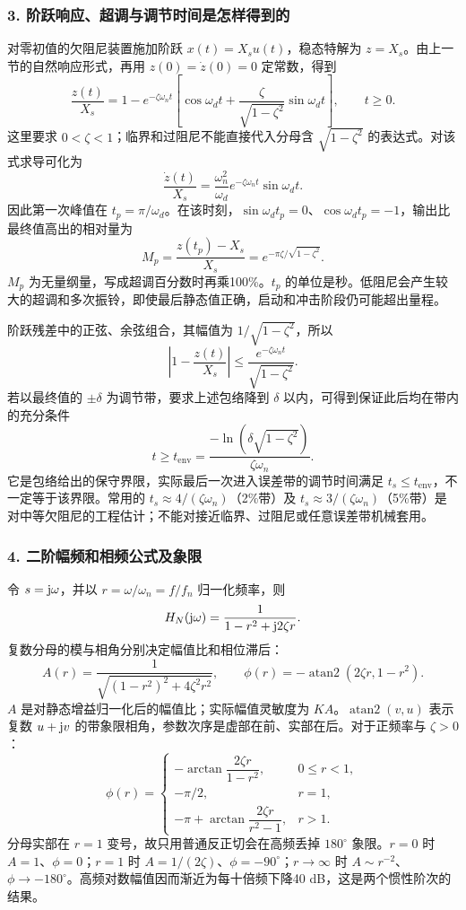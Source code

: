 \subsubsection*{3. 阶跃响应、超调与调节时间是怎样得到的}
对零初值的欠阻尼装置施加阶跃 $x(t)=X_su(t)$，稳态特解为 $z=X_s$。由上一节的自然响应形式，再用 $z(0)=\dot z(0)=0$ 定常数，得到
\[
\frac{z(t)}{X_s}=1-e^{-\zeta\omega_nt}
\left[\cos\omega_dt+
\frac{\zeta}{\sqrt{1-\zeta^2}}\sin\omega_dt\right],\qquad t\geq0.
\]
这里要求 $0<\zeta<1$；临界和过阻尼不能直接代入分母含 $\sqrt{1-\zeta^2}$ 的表达式。对该式求导可化为
\[
\frac{\dot z(t)}{X_s}
=\frac{\omega_n^2}{\omega_d}e^{-\zeta\omega_nt}\sin\omega_dt.
\]
因此第一次峰值在 $t_p=\pi/\omega_d$。在该时刻，$\sin\omega_dt_p=0$、$\cos\omega_dt_p=-1$，输出比最终值高出的相对量为
\[
\boxed{M_p=\frac{z(t_p)-X_s}{X_s}
=e^{-\pi\zeta/\sqrt{1-\zeta^2}}}.
\]
$M_p$ 为无量纲量，写成超调百分数时再乘100\%。$t_p$ 的单位是秒。低阻尼会产生较大的超调和多次振铃，即使最后静态值正确，启动和冲击阶段仍可能超出量程。

阶跃残差中的正弦、余弦组合，其幅值为 $1/\sqrt{1-\zeta^2}$，所以
\[
\left|1-\frac{z(t)}{X_s}\right|
\leq\frac{e^{-\zeta\omega_nt}}{\sqrt{1-\zeta^2}}.
\]
若以最终值的 $\pm\delta$ 为调节带，要求上述包络降到 $\delta$ 以内，可得到保证此后均在带内的充分条件
\[
t\geq t_{\mathrm{env}}
=\frac{-\ln\!\left(\delta\sqrt{1-\zeta^2}\right)}{\zeta\omega_n}.
\]
它是包络给出的保守界限，实际最后一次进入误差带的调节时间满足 $t_s\leq t_{\mathrm{env}}$，不一定等于该界限。常用的 $t_s\approx4/(\zeta\omega_n)$（2\%带）及 $t_s\approx3/(\zeta\omega_n)$（5\%带）是对中等欠阻尼的工程估计；不能对接近临界、过阻尼或任意误差带机械套用。

\subsubsection*{4. 二阶幅频和相频公式及象限}
令 $s=\mathrm{j}\omega$，并以 $r=\omega/\omega_n=f/f_n$ 归一化频率，则
\[
H_N(\mathrm{j}\omega)=\frac{1}{1-r^2+\mathrm{j}2\zeta r}.
\]
复数分母的模与相角分别决定幅值比和相位滞后：
\[
\boxed{A(r)=\frac{1}{\sqrt{(1-r^2)^2+4\zeta^2r^2}}},\qquad
\boxed{\phi(r)=-\operatorname{atan2}(2\zeta r,1-r^2)}.
\]
$A$ 是对静态增益归一化后的幅值比；实际幅值灵敏度为 $K A$。$\operatorname{atan2}(v,u)$ 表示复数 $u+\mathrm{j} v$ 的带象限相角，参数次序是虚部在前、实部在后。对于正频率与 $\zeta>0$：
\[
\phi(r)=
\begin{cases}
-\arctan\dfrac{2\zeta r}{1-r^2},&0\leq r<1,\\[1mm]
-\pi/2,&r=1,\\[1mm]
-\pi+\arctan\dfrac{2\zeta r}{r^2-1},&r>1.
\end{cases}
\]
分母实部在 $r=1$ 变号，故只用普通反正切会在高频丢掉 $180^\circ$ 象限。$r=0$ 时 $A=1$、$\phi=0$；$r=1$ 时 $A=1/(2\zeta)$、$\phi=-90^\circ$；$r\to\infty$ 时 $A\sim r^{-2}$、$\phi\to-180^\circ$。高频对数幅值因而渐近为每十倍频下降40 dB，这是两个惯性阶次的结果。


